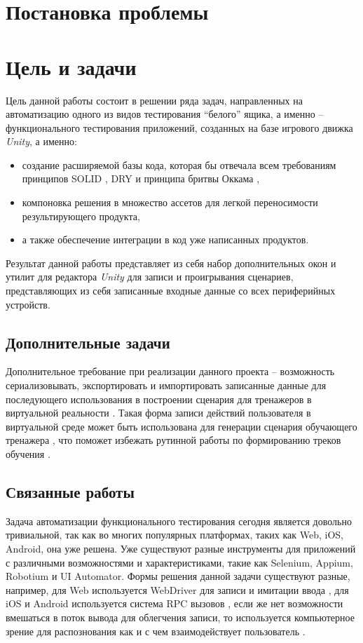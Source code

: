 \Introduction

\section*{Постановка проблемы}

\section*{Цель и задачи}
Цель данной работы состоит в решении ряда задач, направленных на автоматизацию одного из видов тестирования ``белого'' ящика, а именно -- функционального тестирования приложений, созданных на базе игрового  движка \textit{Unity}, а именно: 
\begin{itemize}
	\item 
	создание расширяемой базы кода, которая бы отвечала всем требованиям принципов SOLID \cite{solid}, DRY \cite{dry} и принципа бритвы Оккама \cite{razor},
	\item
	компоновка решения в множество ассетов для легкой переносимости результирующего продукта, 
	\item а также  обеспечение интеграции в код уже написанных продуктов.
\end{itemize}  Результат данной работы представляет из себя набор дополнительных окон и утилит для редактора \textit{Unity} для записи и проигрывания сценариев, представляющих из себя записанные входные данные со всех периферийных устройств.

\subsection*{Дополнительные задачи}
Дополнительное требование при реализации данного проекта -- возможность сериализовывать, экспортировать и импортировать записанные данные для последующего использования в построении сценария для тренажеров в виртуальной реальности \cite{disser}. Такая форма записи действий пользователя в виртуальной среде может быть использована для генерации сценария обучающего тренажера \cite{vr-simulators}, что поможет избежать рутинной работы по формированию треков обучения \cite{visual-editor}.

\subsection*{Связанные работы}
Задача автоматизации функционального тестирования сегодня является довольно тривиальной, так как во многих популярных платформах, таких как Web, iOS, Android, она уже решена. Уже существуют разные инструменты для приложений с различными возможностями и характеристиками, такие как Selenium, Appium, Robotium и UI Automator. Формы решения данной задачи существуют разные, например, для Web используется WebDriver для записи и имитации ввода \cite{selenium}, для iOS и Android используется система RPC вызовов \cite{rpc_testing}, если же нет возможности вмешаться в поток вывода для облегчения записи, то используется компьютерное зрение для распознования как и с чем взаимодействует пользователь \cite{appium_opencv}. 

